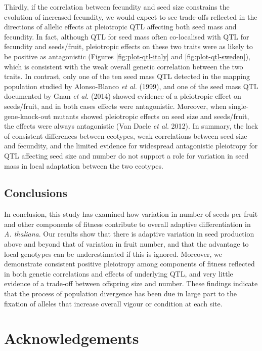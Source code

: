 \documentclass[]{article}
\begin{document}
Thirdly, if the correlation between fecundity and seed size constrains the evolution of increased fecundity, we would expect to see trade-offs reflected in the directions of allelic effects at pleiotropic QTL affecting both seed mass and fecundity. In fact, although QTL for seed mass often co-localised with QTL for fecundity and seeds/fruit, pleiotropic effects on these two traits were as likely to be positive as antagonistic (Figures \ref{fig:plot-qtl-italy} and \ref{fig:plot-qtl-sweden}), which is consistent with the weak overall genetic correlation between the two traits. In contrast, only one of the ten seed mass QTL detected in the mapping population studied by Alonso-Blanco \emph{et al.} (1999), and one of the seed mass QTL documented by Gnan \emph{et al.} (2014) showed evidence of a pleiotropic effect on seeds/fruit, and in both cases effects were antagonistic. Moreover, when single-gene-knock-out mutants showed pleiotropic effects on seed size and seeds/fruit, the effects were always antagonistic (Van Daele \emph{et al.} 2012). In summary, the lack of consistent differences between ecotypes, weak correlations between seed size and fecundity, and the limited evidence for widespread antagonistic pleiotropy for QTL affecting seed size and number do not support a role for variation in seed mass in local adaptation between the two ecotypes.

\hypertarget{conclusions}{%
\subsection{Conclusions}\label{conclusions}}

In conclusion, this study has examined how variation in number of seeds per fruit and other components of fitness contribute to overall adaptive differentiation in \emph{A. thaliana}. Our results show that there is adaptive variation in seed production above and beyond that of variation in fruit number, and that the advantage to local genotypes can be underestimated if this is ignored. Moreover, we demonstrate consistent positive pleiotropy among components of fitness reflected in both genetic correlations and effects of underlying QTL, and very little evidence of a trade-off between offspring size and number. These findings indicate that the process of population divergence has been due in large part to the fixation of alleles that increase overall vigour or condition at each site.

\hypertarget{acknowledgements}{%
\section{Acknowledgements}\label{acknowledgements}}
\end{document}
